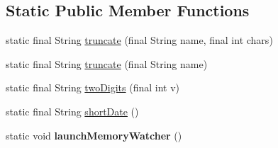 \subsection*{Static Public Member Functions}
\begin{DoxyCompactItemize}
\item 
static final String \hyperlink{classgov_1_1fnal_1_1ppd_1_1dd_1_1util_1_1nonguiUtils_1_1GeneralUtilities_ac0fbe7f166c44d0db945ce9ae66d79ad}{truncate} (final String name, final int chars)
\item 
static final String \hyperlink{classgov_1_1fnal_1_1ppd_1_1dd_1_1util_1_1nonguiUtils_1_1GeneralUtilities_a388dcd9586e091a5fe290f9ed2cb81d5}{truncate} (final String name)
\item 
static final String \hyperlink{classgov_1_1fnal_1_1ppd_1_1dd_1_1util_1_1nonguiUtils_1_1GeneralUtilities_a4b0a62f165274e692d9bcd99c21c23fa}{two\-Digits} (final int v)
\item 
static final String \hyperlink{classgov_1_1fnal_1_1ppd_1_1dd_1_1util_1_1nonguiUtils_1_1GeneralUtilities_adac619e2acf170eb5d0a00dfe1f9b8d8}{short\-Date} ()
\item 
\hypertarget{classgov_1_1fnal_1_1ppd_1_1dd_1_1util_1_1nonguiUtils_1_1GeneralUtilities_a572f6d7db4204737435a39c1457d4480}{static void {\bfseries launch\-Memory\-Watcher} ()}\label{classgov_1_1fnal_1_1ppd_1_1dd_1_1util_1_1nonguiUtils_1_1GeneralUtilities_a572f6d7db4204737435a39c1457d4480}


\end{DoxyCompactItemize}
